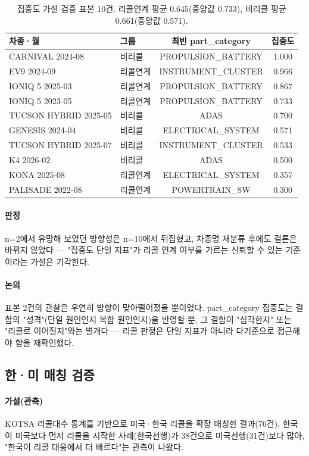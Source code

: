 \documentclass[11pt]{article}
\begin{document}
\begin{table}[H]
\centering
\small
\begin{tabular}{llcc}
\toprule
차종·월 & 그룹 & 최빈 part\_category & 집중도 \\
\midrule
CARNIVAL 2024-08 & 비리콜 & PROPULSION\_BATTERY & 1.000 \\
EV9 2024-09 & 리콜연계 & INSTRUMENT\_CLUSTER & 0.966 \\
IONIQ 5 2025-03 & 리콜연계 & PROPULSION\_BATTERY & 0.867 \\
IONIQ 5 2023-05 & 리콜연계 & PROPULSION\_BATTERY & 0.733 \\
TUCSON HYBRID 2025-05 & 비리콜 & ADAS & 0.700 \\
GENESIS 2024-04 & 비리콜 & ELECTRICAL\_SYSTEM & 0.571 \\
TUCSON HYBRID 2025-07 & 비리콜 & INSTRUMENT\_CLUSTER & 0.533 \\
K4 2026-02 & 비리콜 & ADAS & 0.500 \\
KONA 2025-08 & 리콜연계 & ELECTRICAL\_SYSTEM & 0.357 \\
PALISADE 2022-08 & 리콜연계 & POWERTRAIN\_SW & 0.300 \\
\bottomrule
\end{tabular}
\caption{집중도 가설 검증 표본 10건. 리콜연계 평균 0.645(중앙값 0.733), 비리콜 평균 0.661(중앙값 0.571).}
\label{tab:concentration}
\end{table}

\paragraph{판정} n=2에서 유망해 보였던 방향성은 n=10에서 뒤집혔고, 차종명 재분류 후에도 결론은 바뀌지 않았다 — "집중도 단일 지표"가 리콜 연계 여부를 가르는 신뢰할 수 있는 기준이라는 가설은 기각한다.

\paragraph{논의} 표본 2건의 관찰은 우연히 방향이 맞아떨어졌을 뿐이었다. part\_category 집중도는 결함의 "성격"(단일 원인인지 복합 원인인지)을 반영할 뿐, 그 결함이 "심각한지" 또는 "리콜로 이어질지"와는 별개다 — 리콜 판정은 단일 지표가 아니라 다기준으로 접근해야 함을 재확인했다.

\subsection{한·미 매칭 검증}

\paragraph{가설(관측)} KOTSA 리콜대수 통계를 기반으로 미국·한국 리콜을 확장 매칭한 결과(76건), 한국이 미국보다 먼저 리콜을 시작한 사례(한국선행)가 38건으로 미국선행(31건)보다 많아, "한국이 리콜 대응에서 더 빠르다"는 관측이 나왔다.
\end{document}
